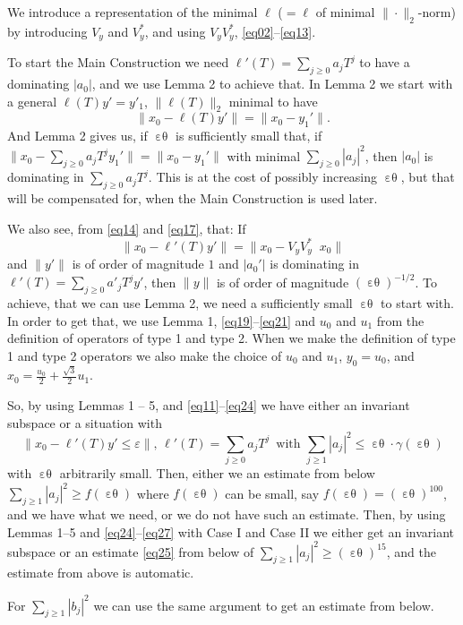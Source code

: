 \documentclass[12pt,oneside,reqno]{amsart}
\theoremstyle{definition}
\DeclareMathOperator*{\VV}{[\,\, ]^{-1}}
\DeclareMathOperator*{\VE}{\varepsilon\theta}
\begin{document}
We introduce a representation of the minimal $\ell$ ($ = \ell$ of minimal $\|\cdot\|_2$-norm) by introducing $V_y$ and $V_y^*$, and using $V_y V_y^*$, \eqref{eq02}--\eqref{eq13}.

To start the Main Construction we need $\displaystyle \ell'(T) = \sum_{j \ge 0} a_j T^j$ to have a dominating $|a_0|$, and we use Lemma 2 to achieve that. In Lemma 2 we start with a general $\ell (T) y' = y'_1$, $\|\ell(T)\|_2$ minimal to have
$$\|x_0 - \ell(T) y'\| = \|x_0 - y_1'\|.$$
And Lemma 2 gives us, if $\VE$ is sufficiently small that, if $\displaystyle \|x_0 - \sum_{j \ge 0} a_j T^j y_1'\| = \|x_0 - y_1'\|$ with minimal $\displaystyle \sum_{j \ge 0} |a_j|^2$, then $|a_0|$ is dominating in $\displaystyle \sum_{j \ge 0} a_j T^j$. This is at the cost of possibly increasing $\VE$, but that will be compensated for, when the Main Construction is used later.

We also see, from \eqref{eq14} and \eqref{eq17}, that: If 
$$\|x_0 - \ell' (T) y' \| = \|x_0 - V_y V_y^* \VV x_0\|$$ 
and $\|y'\|$ is of order of magnitude $1$ and $|a_0'|$ is dominating in  $\displaystyle \ell'(T) = \sum_{j \ge 0} a'_j T^j y'$, then $\|y\|$ is of order of magnitude $(\VE)^{-1/2}$. To achieve, that we can use Lemma 2, we need a sufficiently small $\VE$ to start with. In order to get that, we use Lemma 1, \eqref{eq19}--\eqref{eq21} and $u_0$ and $u_1$ from the definition of operators of type 1 and type 2. When we make the definition of type 1 and type 2 operators we also make the choice of $u_0$ and $u_1$, $y_0 = u_0$, and $\displaystyle x_0 = \frac{u_0}{2} + \frac{\sqrt{3}}{2} u_1.$

So, by using Lemmas 1 -- 5, and \eqref{eq11}--\eqref{eq24} we have either an invariant subspace or a situation with 
$$\|x_0 - \ell'(T) y' \le \varepsilon\|, \, \ell' (T) = \sum_{j \ge 0} a_j T^j \, \text{ with } \sum_{j \ge 1} |a_j|^2 \le \VE \cdot \gamma (\VE)$$
with $\VE$ arbitrarily small. Then, either we an estimate from below $\displaystyle \sum_{j \ge 1} |a_j|^2 \ge f(\VE)$ where $f(\VE)$ can be small, say $f(\VE) = (\VE)^{100}$, and we have what we need, or  we do not have such an estimate. Then, by using Lemmas 1--5 and \eqref{eq24}--\eqref{eq27} with Case I and Case II we either get an invariant subspace or an estimate \eqref{eq25} from below of $\displaystyle \sum_{j \ge 1} |a_j|^2 \ge (\VE)^{15}$, and the estimate from above is automatic.

For  $\displaystyle \sum_{j \ge 1} |b_j|^2$ we can use the same argument to get an estimate from below.
\end{document}
